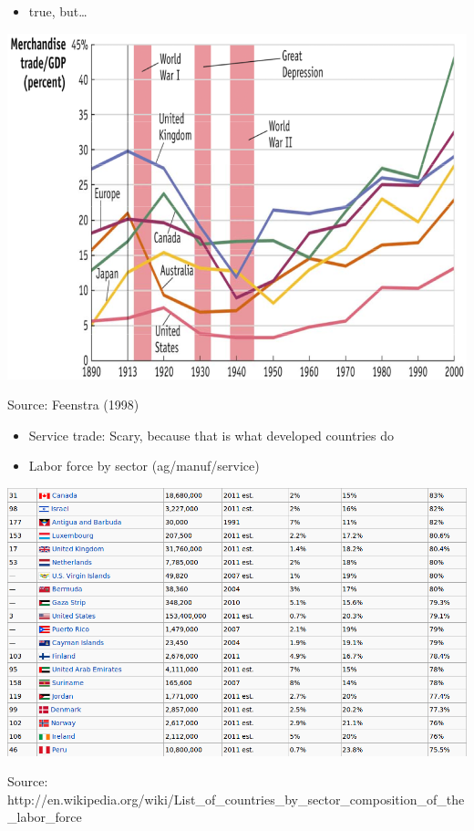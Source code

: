 \documentclass[ignorenonframetext,]{beamer}
\begin{document}
\begin{frame}

    \begin{itemize}
        \itemsep1pt\parskip0pt
        \item true, but\dots
    \end{itemize}
   
    \includegraphics[scale=0.25]{trade_to_gdp_historical.png}

    {\tiny Source: Feenstra (1998)}

\end{frame}

\begin{frame}

    \begin{itemize}
        \item Service trade: Scary, because that is what developed countries do
        \item Labor force by sector (ag/manuf/service)
    \end{itemize}
    
    \includegraphics[scale=0.30]{sector_comp_of_labor_force.png}

    {\tiny Source: http://en.wikipedia.org/wiki/List\_of\_countries\_by\_sector\_composition\_of\_the\_labor\_force}

\end{frame}
\end{document}
